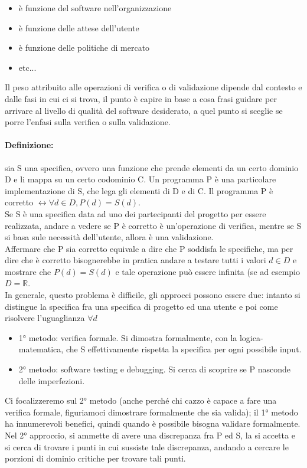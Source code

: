 \documentclass{article}
\begin{document}
\begin{itemize}
\item è funzione del software nell'organizzazione
\item è funzione delle attese dell'utente 
\item è funzione delle politiche di mercato
\item etc...
\end{itemize}
Il peso attribuito alle operazioni di verifica o di validazione dipende dal contesto e dalle fasi in cui ci si trova, il punto è capire in base a cosa frasi guidare per arrivare al livello di qualità del software desiderato, a quel punto si sceglie se porre l'enfasi sulla verifica o sulla validazione.
\paragraph{Definizione:} sia S una specifica, ovvero una funzione che prende elementi da un certo dominio D e li mappa su un certo codominio C. Un programma P è una particolare implementazione di S, che lega gli elementi di D e di C. Il programma P è corretto $\leftrightarrow \forall d \in D, P(d) = S(d)$.\\ Se S è una specifica data ad uno dei partecipanti del progetto per essere realizzata, andare a vedere se P è corretto è un'operazione di verifica, mentre se S si basa sule necessità dell'utente, allora è una validazione.\\ Affermare che P sia corretto equivale a dire che P soddisfa le specifiche, ma per dire che è corretto bisognerebbe in pratica andare a testare tutti i valori $d \in D$ e mostrare che $P(d) = S(d)$ e tale operazione può essere infinita (se ad esempio $D = \mathbb{R}$.\\ In generale, questo problema è difficile, gli approcci possono essere due: intanto si distingue la specifica fra una specifica di progetto ed una utente e poi come risolvere l'uguaglianza $\forall d$
\begin{itemize}
\item 1° metodo: verifica formale. Si dimostra formalmente, con la logica-matematica, che S effettivamente rispetta la specifica per ogni possibile input.
\item 2° metodo: software testing e debugging. Si cerca di scoprire se P nasconde delle imperfezioni.
\end{itemize}
Ci focalizzeremo sul 2° metodo (anche perché chi cazzo è capace a fare una verifica formale, figuriamoci dimostrare formalmente che sia valida); il 1° metodo ha innumerevoli benefici, quindi quando è possibile bisogna validare formalmente.\\ Nel 2° approccio, si ammette di avere una discrepanza fra P ed S, la si accetta e si cerca di trovare i punti in cui sussiste tale discrepanza, andando a cercare le porzioni di dominio critiche per trovare tali punti.
\end{document}
